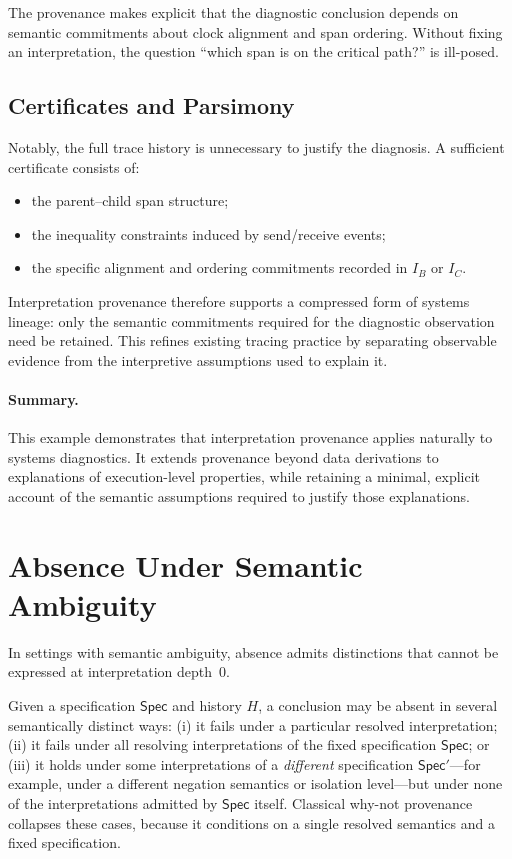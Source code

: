 \documentclass[acmsmall,nonacm]{acmart}
\theoremstyle{remark}
\numberwithin{definition}{section}
\numberwithin{theorem}{section}
\numberwithin{lemma}{section}
\numberwithin{corollary}{section}
\numberwithin{remark}{section}
\numberwithin{example}{section}
\numberwithin{observation}{section}
\numberwithin{assumption}{section}
\newcommand{\Spec}{\mathsf{Spec}}
\begin{document}
The provenance makes explicit that the diagnostic conclusion depends on semantic
commitments about clock alignment and span ordering.
Without fixing an interpretation, the question ``which span is on the critical
path?'' is ill-posed.

\subsection{Certificates and Parsimony}

Notably, the full trace history is unnecessary to justify the diagnosis.
A sufficient certificate consists of:
\begin{itemize}
  \item the parent--child span structure;
  \item the inequality constraints induced by send/receive events;
  \item the specific alignment and ordering commitments recorded in $I_B$ or
        $I_C$.
\end{itemize}

Interpretation provenance therefore supports a compressed form of systems lineage:
only the semantic commitments required for the diagnostic observation need be
retained.
This refines existing tracing practice by separating observable evidence from the
interpretive assumptions used to explain it.

\paragraph{Summary.}
This example demonstrates that interpretation provenance applies naturally to
systems diagnostics.
It extends provenance beyond data derivations to explanations of execution-level
properties, while retaining a minimal, explicit account of the semantic
assumptions required to justify those explanations.

\section{Absence Under Semantic Ambiguity}
\label{app:whynot}
In settings with semantic ambiguity, absence admits distinctions that cannot be
expressed at interpretation depth~0.

Given a specification $\Spec$ and history $H$, a conclusion may be absent in
several semantically distinct ways:
(i) it fails under a particular resolved interpretation;
(ii) it fails under all resolving interpretations of the fixed specification
$\Spec$; or
(iii) it holds under some interpretations of a \emph{different} specification
$\Spec'$—for example, under a different negation semantics or isolation level—but
under none of the interpretations admitted by $\Spec$ itself.
Classical why-not provenance collapses these cases, because it conditions on a
single resolved semantics and a fixed specification.
\end{document}
